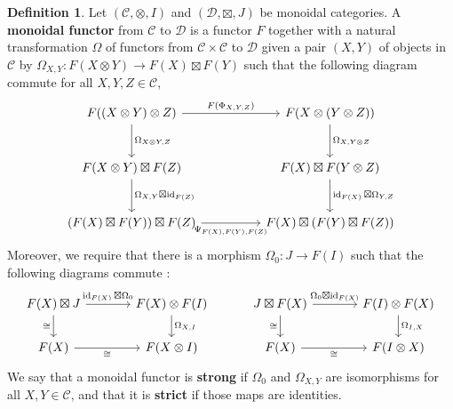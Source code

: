 \documentclass{article}
\theoremstyle{plain}
\theoremstyle{definition}
\newtheorem{definition}[theorem]{Definition}
\DeclareMathOperator{\id}{id}
\begin{document}
\begin{definition}
    Let $(\mathcal{C}, \otimes, I)$ and $(\mathcal{D}, \boxtimes, J)$ be monoidal categories.
    A \textbf{monoidal functor} from $\mathcal{C}$ to $\mathcal{D}$ is a functor $F$ together with a natural transformation $\Omega$ of functors from $\mathcal{C}\times \mathcal{C}$ to $\mathcal{D}$ given a pair $(X,Y)$ of objects in $\mathcal{C}$ by 
    $\Omega_{X,Y} : F(X\otimes Y)\rightarrow F(X) \boxtimes F(Y)$
    such that the following diagram commute for all $X,Y,Z\in \mathcal{C}$,
    \[
    \begin{tikzcd}[row sep = large, column sep = huge]
        F((X\otimes Y)\otimes Z) \arrow[r, "F(\Phi_{X,Y,Z})"] \arrow[d, "\Omega_{X\otimes Y, Z}"] & 
        F(X\otimes (Y\otimes Z))
        \arrow[d, "\Omega_{X,Y\otimes Z}"]\\
        F(X\otimes Y) \boxtimes F(Z)
        \arrow[d,"\Omega_{X,Y}\boxtimes \id_{F(Z)}"] & 
        F(X)\boxtimes F(Y\otimes Z)
        \arrow[d, "\id_{F(X)}\boxtimes \Omega_{Y,Z}"]\\
        (F(X)\boxtimes F(Y))\boxtimes F(Z)
        \arrow[r,"\Psi_{F(X),F(Y),F(Z)}"'] &
        F(X)\boxtimes (F(Y)\boxtimes F(Z))
    \end{tikzcd}
    \]
    Moreover, we require that there is a morphism $\Omega_0 : J\rightarrow F(I)$ such that the following diagrams commute : 
    \[
    \begin{tikzcd}[column sep = large]
        F(X)\boxtimes J
        \arrow[r,"\id_{F(X)}\boxtimes \Omega_0"] 
        \arrow[d, "\cong"'] & 
        F(X)\otimes F(I) 
        \arrow[d,"\Omega_{X,I}"]\\
        F(X) 
        \arrow[r,"\cong"'] &  
        F(X\otimes I) 
    \end{tikzcd}
    \hspace{1cm}
    \begin{tikzcd}[column sep = large]
        J \boxtimes F(X)
        \arrow[r," \Omega_0 \boxtimes \id_{F(X)}"] 
        \arrow[d, "\cong"']& 
        F(I)\otimes F(X) 
        \arrow[d,"\Omega_{I,X}"]\\
        F(X) 
        \arrow[r,"\cong"'] &  
        F(I\otimes X) 
    \end{tikzcd}
    \]
    We say that a monoidal functor is \textbf{strong} if $\Omega_0$ and $\Omega_{X,Y}$ are isomorphisms for all $X,Y\in \mathcal{C}$, and that it is \textbf{strict} if those maps are identities.
\end{definition}
\end{document}
